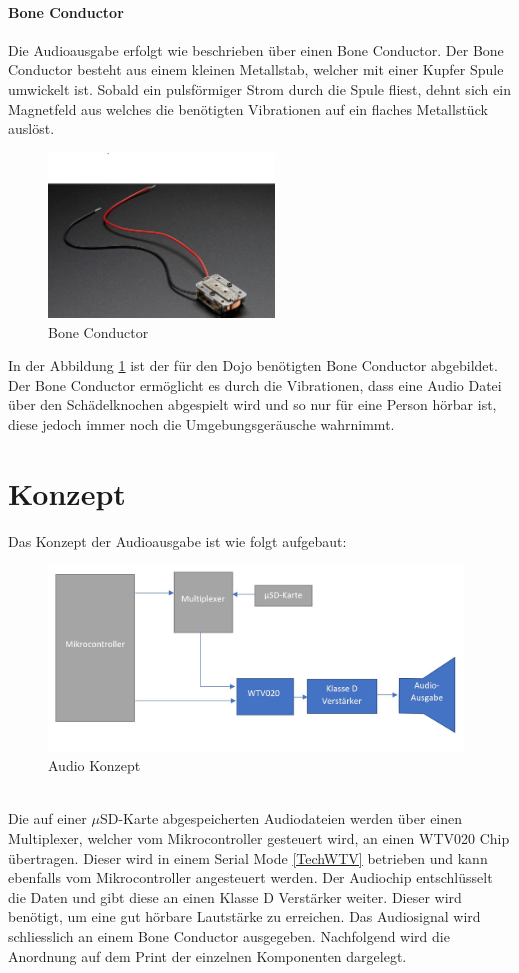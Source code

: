 \paragraph{Bone Conductor}
Die Audioausgabe erfolgt wie beschrieben über einen Bone Conductor. Der Bone Conductor besteht aus einem kleinen Metallstab, welcher mit einer Kupfer Spule umwickelt ist. Sobald ein pulsförmiger Strom durch die Spule fliest, dehnt sich ein Magnetfeld aus welches die benötigten Vibrationen auf ein flaches Metallstück auslöst. 
\begin{figure}[h]
	\centering
	\includegraphics[width=6cm]{Bilder/Bone-Conductor.jpg}
	\caption[Bone Conductor]{Bone Conductor \cite{BoneConductor}}
	\label{Bone-Conductor}
\end{figure}

In der Abbildung \ref{Bone-Conductor} ist der für den Dojo benötigten Bone Conductor abgebildet. Der Bone Conductor ermöglicht es durch die Vibrationen, dass eine Audio Datei über den Schädelknochen abgespielt wird und so nur für eine Person hörbar ist, diese jedoch immer noch die Umgebungsgeräusche wahrnimmt. \cite{BoneConductor}



\section{Konzept}\label{AudioKonzept}
Das Konzept der Audioausgabe ist wie folgt aufgebaut:
\begin{figure}[h]
	\centering
	\includegraphics[width=11cm]{Bilder/Audio-Konzept.jpg}
	\caption{Audio Konzept}
	\label{Audio-Konzept}
\end{figure}\\
Die auf einer $\mu$SD-Karte abgespeicherten Audiodateien werden über einen Multiplexer, welcher vom Mikrocontroller gesteuert wird, an einen WTV020 Chip übertragen. Dieser wird in einem Serial Mode \ref{TechWTV} betrieben und kann ebenfalls vom Mikrocontroller angesteuert werden. Der Audiochip entschlüsselt die Daten und gibt diese an einen Klasse D Verstärker weiter. Dieser wird benötigt, um eine gut hörbare Lautstärke zu erreichen. Das Audiosignal wird schliesslich an einem Bone Conductor ausgegeben. 
Nachfolgend wird die Anordnung auf dem Print der einzelnen Komponenten dargelegt. 
